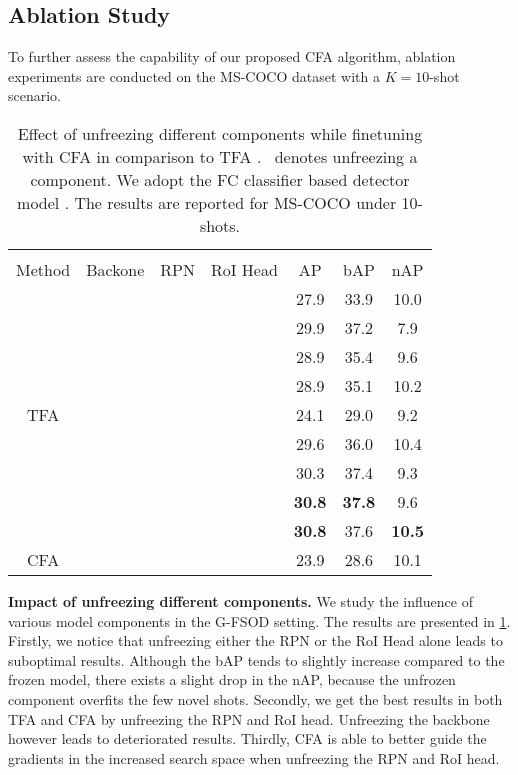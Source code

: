 \documentclass[10pt,twocolumn,letterpaper]{article}
\newcommand{\cmark}{\ding{51}}\newcommand{\xmark}{\ding{55}}\newcommand\minisection[1]{\vspace{1mm}\noindent \textbf{#1}}
\begin{document}
\subsection{Ablation Study}
To further assess the capability of our proposed CFA algorithm, ablation experiments are conducted on the MS-COCO dataset with a $K=10$-shot scenario.
\begin{table}[t!] \centering
	\setlength{\tabcolsep}{2.5mm}
	\scalebox{0.8}
	{\begin{tabular}{c|ccc|ccc}
\toprule[1.1pt]
			\multicolumn{1}{c|}{}            & \multicolumn{3}{c|}{}                  &\multicolumn{3}{c}{} \\
			\multicolumn{1}{c|}{\multirow{-2}{*}{Method}}      &\multicolumn{1}{c}{\multirow{-2}{*}{Backone}} & \multicolumn{1}{c}{\multirow{-2}{*}{RPN}}        & \multicolumn{1}{c|}{\multirow{-2}{*}{RoI Head}}                       & \multicolumn{1}{c}{\multirow{-2}{*}{AP}}            & \multicolumn{1}{c}{\multirow{-2}{*}{bAP}}  &  \multicolumn{1}{c}{\multirow{-2}{*}{nAP}}                 \\
			\midrule[0.9pt]
			  &&&& 27.9 & 33.9 & 10.0 \\
			  & &\cmark&&29.9&37.2& 7.9\\
			  &  &&\cmark&28.9&35.4&9.6 \\
			  &&\cmark&\cmark&28.9&35.1&10.2 \\
			\multirow{-5}{*}{TFA}  &\cmark &\cmark&\cmark&24.1&29.0&9.2 \\
			\midrule[0.9pt]
			  & &&&29.6&36.0&10.4\\
			  & &\cmark&&30.3&37.4&9.3 \\
			  &  &&\cmark&\textbf{30.8}&\textbf{37.8}&9.6 \\
			  & &\cmark&\cmark&\textbf{30.8} & 37.6 & \textbf{10.5} \\
			\multirow{-5}{*}{CFA}  &\cmark &\cmark&\cmark&23.9&28.6&10.1 \\
			
			
			\bottomrule[1.1pt]
	\end{tabular}}
\caption{Effect of unfreezing different components while finetuning with CFA in comparison to TFA \cite{TFA}. \cmark\ denotes unfreezing a component. We adopt the FC classifier based detector model \cite{FasterR-CNN}. The results are reported for MS-COCO under 10-shots.}
	\vspace{-1em}
	\label{tab:ablation-study}
\end{table} 

\textbf{Impact of unfreezing different components.} We study the influence of various model components in the G-FSOD setting. The results are presented in \cref{tab:ablation-study}.
Firstly, we notice that unfreezing either the RPN or the RoI Head alone leads to suboptimal results. Although the bAP tends to slightly increase compared to the frozen model, there exists a slight drop in the nAP, because the unfrozen component overfits the few novel shots. Secondly, we get the best results in both TFA and CFA by unfreezing the RPN and RoI head. Unfreezing the backbone however leads to deteriorated results. Thirdly, CFA is able to better guide the gradients in the increased search space when unfreezing the RPN and RoI head.  
\end{document}
